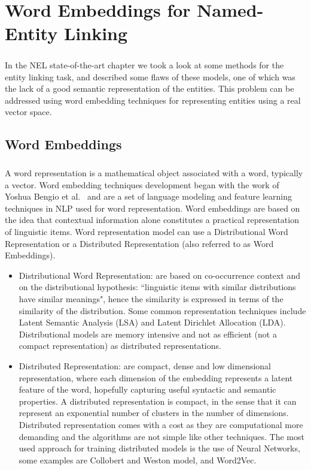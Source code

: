 \chapter{Word Embeddings for Named-Entity Linking}

\paragraph{}
In the NEL state-of-the-art chapter we took a look at some methods for the entity linking task, and described some flaws of these models, one of which was the lack of a good semantic representation of the entities. This problem can be addressed using word embedding techniques for representing entities using a real vector space. 

\nocite{sebastianruder}
\nocite{turian2010word}
\section{Word Embeddings}
\paragraph{}
A word representation is a mathematical object associated with a word, typically a vector. Word embedding techniques development began with the work of Yoshua Bengio et al.~\cite{bengio2003neural} and are a set of language modeling and feature learning techniques in NLP used for word representation. Word embeddings are based on the idea that contextual information alone constitutes a practical representation of linguistic items. Word representation model can use a Distributional Word Representation or a Distributed Representation (also referred to as Word Embeddings).

\begin{itemize}[itemsep = 0.1em]
\item Distributional Word Representation: are based on co-occurrence context and on the distributional hypothesis:  ``linguistic items with similar distributions have similar meanings", hence the similarity is expressed in terms of the similarity of the distribution. Some common representation techniques include Latent Semantic Analysis (LSA) and Latent Dirichlet Allocation (LDA). Distributional models are memory intensive and not as efficient (not a compact representation) as distributed representations.

\item Distributed Representation: are compact, dense and low dimensional representation, where each dimension of the embedding represents a latent feature of the word, hopefully capturing useful syntactic and semantic properties. A distributed representation is compact, in the sense that it can represent an exponential number of clusters in the number of dimensions. Distributed representation comes with a cost as they are computational more demanding and the algorithms are not simple like other techniques. The most used approach for training distributed models is the use of Neural Networks, some examples are Collobert and Weston model, and Word2Vec.
\end{itemize}

